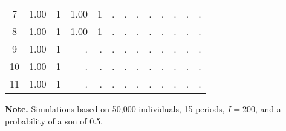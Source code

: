 \documentclass[12pt,letterpaper]{article}
\begin{document}
\begin{table}[!htp]
\begin{threeparttable}
\begin{tabular}{@{} c D{.}{.}{1.2} D{.}{.}{2.0} D{.}{.}{1.2} D{.}{.}{2.0} D{.}{.}{1.2} D{.}{.}{2.0} D{.}{.}{1.2} D{.}{.}{2.0} D{.}{.}{1.2} D{.}{.}{2.0} D{.}{.}{1.2} D{.}{.}{2.0} @{}}
 7             &  1.00 &     1 &  1.00 &     1 &     . &     . &     . &     . &     . &     . &     . &     . \\
 8             &  1.00 &     1 &  1.00 &     1 &     . &     . &     . &     . &     . &     . &     . &     . \\
 9             &  1.00 &     1 &     . &     . &     . &     . &     . &     . &     . &     . &     . &     . \\
 10            &  1.00 &     1 &     . &     . &     . &     . &     . &     . &     . &     . &     . &     . \\
 11            &  1.00 &     1 &     . &     . &     . &     . &     . &     . &     . &     . &     . &     . \\
\bottomrule
\end{tabular}
\begin{tablenotes} \tiny
\item \hspace*{-0.5em} \textbf{Note.} Simulations based on  50,000 individuals, 15 periods, $ I = 200 $,
 and a probability of a son of 0.5.
\end{tablenotes}
\end{threeparttable}
\normalsize
\end{table}
\end{document}
